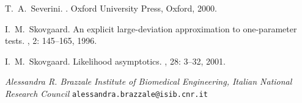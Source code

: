 \documentclass[a4paper,11pt]{article}
\def\code{\texttt}
\begin{document}
\begin{thebibliography}{10}
T.~A.~Severini.
.
\newblock Oxford University Press, Oxford, 2000.

I.~M.~Skovgaard.
\newblock An explicit large-deviation approximation to one-parameter tests.
, 2: 145--165, 1996.

I.~M.~Skovgaard.
\newblock Likelihood asymptotics.
, 28: 3--32, 2001.

\end{thebibliography}


\vspace{\baselineskip}

\noindent
\emph{Alessandra R. Brazzale} \newline
\emph{Institute of Biomedical Engineering, Italian National Research Council} \newline
\code{alessandra.brazzale@isib.cnr.it}
\end{document}
